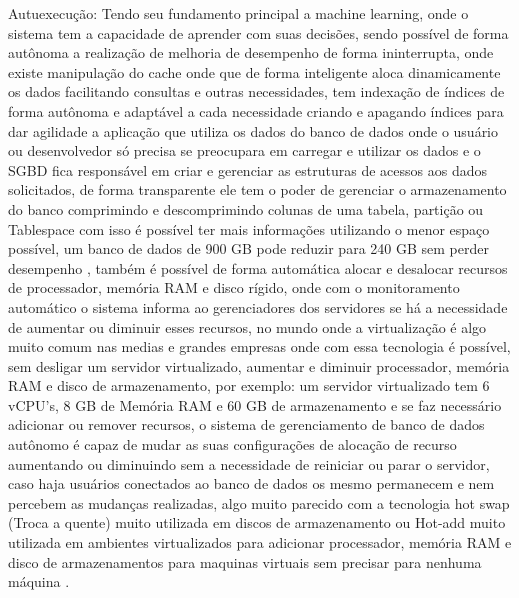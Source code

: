 	Autuexecução: Tendo seu fundamento principal a machine learning, onde o sistema tem a capacidade de aprender com suas decisões, sendo possível de forma autônoma a realização de melhoria de desempenho de forma ininterrupta, onde existe manipulação do cache onde que de forma inteligente aloca dinamicamente os dados facilitando consultas e outras necessidades, tem indexação de índices de forma autônoma e adaptável a cada necessidade criando e apagando índices para dar agilidade a aplicação que utiliza os dados do banco de dados onde o usuário ou desenvolvedor só precisa se preocupara em carregar e utilizar os dados e o SGBD fica responsável em criar e gerenciar as estruturas de acessos aos dados solicitados, de forma transparente ele tem o poder de gerenciar o armazenamento do banco comprimindo e descomprimindo colunas de uma tabela, partição ou Tablespace com isso é possível ter mais informações utilizando o menor espaço possível, um banco de dados de 900 GB pode reduzir para 240 GB sem perder desempenho \cite{OracleExadata}, também é possível de forma automática alocar e desalocar recursos de processador, memória RAM e disco rígido, onde com o monitoramento automático o sistema informa ao gerenciadores dos servidores se há a necessidade de aumentar ou diminuir esses recursos, no mundo onde a virtualização é algo muito comum nas medias e grandes empresas onde com essa tecnologia é possível, sem desligar um servidor virtualizado, aumentar e diminuir processador, memória RAM e disco de armazenamento, por exemplo: um servidor virtualizado tem 6 vCPU’s, 8 GB de Memória RAM e 60 GB de armazenamento e se faz necessário adicionar ou remover recursos, o sistema de gerenciamento de banco de dados autônomo é capaz de mudar as suas configurações de alocação de recurso aumentando ou diminuindo sem a necessidade de reiniciar ou parar o servidor, caso haja usuários conectados ao banco de dados os mesmo permanecem e nem percebem as mudanças realizadas, algo muito parecido com a tecnologia hot swap (Troca a quente) muito utilizada em discos de armazenamento ou Hot-add muito utilizada em ambientes virtualizados para adicionar processador, memória RAM e disco de armazenamentos para maquinas virtuais sem precisar para nenhuma máquina \cite{OracleBreakingFree}.
	
